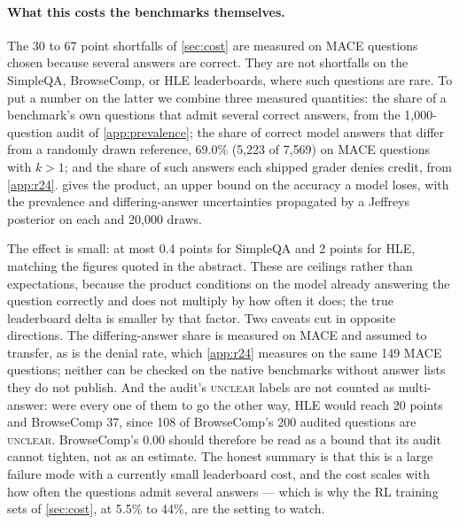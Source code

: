 \paragraph{What this costs the benchmarks themselves.}
The 30 to 67 point shortfalls of \cref{sec:cost} are measured on \textsc{MACE} questions chosen
because several answers are correct. They are not shortfalls on the SimpleQA, BrowseComp, or HLE
leaderboards, where such questions are rare. To put a number on the latter we combine three measured
quantities: the share of a benchmark's own questions that admit several correct answers, from the
1{,}000-question audit of \cref{app:prevalence}; the share of correct model answers that differ from a
randomly drawn reference, 69.0\% (5{,}223 of 7{,}569) on \textsc{MACE} questions with $k>1$; and the
share of such answers each shipped grader denies credit, from \cref{app:r24}. 
gives the product, an upper bound on the accuracy a model loses, with the prevalence and
differing-answer uncertainties propagated by a Jeffreys
posterior on each and 20{,}000 draws.

The effect is small: at most 0.4 points for SimpleQA and 2 points for HLE, matching the figures quoted in the abstract.
These are ceilings rather than expectations, because the product conditions on the model already
answering the question correctly and does not multiply by how often it does; the true leaderboard
delta is smaller by that factor.
Two caveats cut in opposite directions. The differing-answer share is measured on \textsc{MACE} and
assumed to transfer, as is the denial rate, which \cref{app:r24} measures on the same 149 \textsc{MACE}
questions; neither can be checked on the native benchmarks without answer lists they do not publish. And the audit's \textsc{unclear} labels are not counted as multi-answer: were every one of
them to go the other way, HLE would reach 20 points and BrowseComp 37, since 108 of BrowseComp's 200
audited questions are \textsc{unclear}. BrowseComp's $0.00$ should therefore be read as a bound that its audit cannot tighten, not as an estimate. The honest
summary is that this is a large failure mode with a currently small leaderboard cost, and the cost
scales with how often the questions admit several answers --- which is why the RL training sets of
\cref{sec:cost}, at 5.5\% to 44\%, are the setting to watch.

